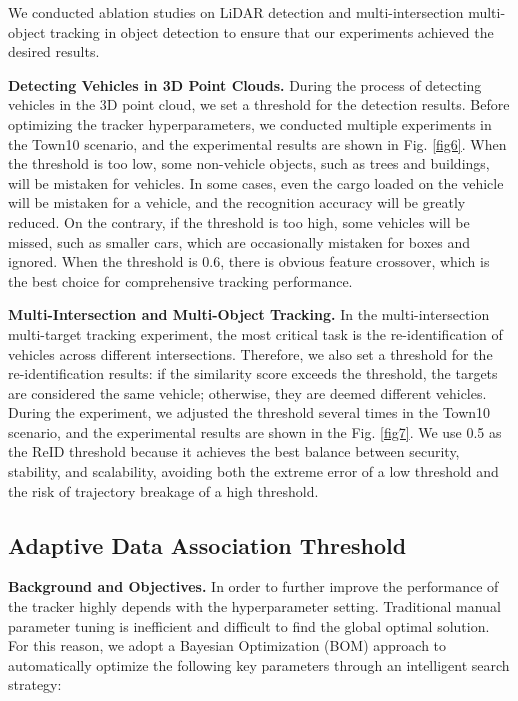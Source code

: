 \documentclass[journal,twoside,web]{ieeecolor}
\begin{document}
We conducted ablation studies on LiDAR detection and multi-intersection multi-object tracking in object detection to ensure that our experiments achieved the desired results.

\textbf{Detecting Vehicles in 3D Point Clouds.}
During the process of detecting vehicles in the 3D point cloud, we set a threshold for the detection results.
Before optimizing the tracker hyperparameters, we conducted multiple experiments in the Town10 scenario, and the experimental results are shown in Fig. \ref{fig6}.
When the threshold is too low, some non-vehicle objects, such as trees and buildings, will be mistaken for vehicles. In some cases, even the cargo loaded on the vehicle will be mistaken for a vehicle, and the recognition accuracy will be greatly reduced.
On the contrary, if the threshold is too high, some vehicles will be missed, such as smaller cars, which are occasionally mistaken for boxes and ignored.
When the threshold is 0.6, there is obvious feature crossover, which is the best choice for comprehensive tracking performance.

\textbf{Multi-Intersection and Multi-Object Tracking.}
In the multi-intersection multi-target tracking experiment, the most critical task is the re-identification of vehicles across different intersections. 
Therefore, we also set a threshold for the re-identification results: if the similarity score exceeds the threshold, the targets are considered the same vehicle; otherwise, they are deemed different vehicles. 
During the experiment, we adjusted the threshold several times in the Town10 scenario, and the experimental results are shown in the Fig. \ref{fig7}.
We use 0.5 as the ReID threshold because it achieves the best balance between security, stability, and scalability, avoiding both the extreme error of a low threshold and the risk of trajectory breakage of a high threshold.

\subsection{Adaptive Data Association Threshold}

\textbf{Background and Objectives.}
In order to further improve the performance of the tracker highly depends with the hyperparameter setting. 
Traditional manual parameter tuning is inefficient and difficult to find the global optimal solution. 
For this reason, we adopt a Bayesian Optimization (BOM) approach to automatically optimize the following key parameters through an intelligent search strategy:
\end{document}

